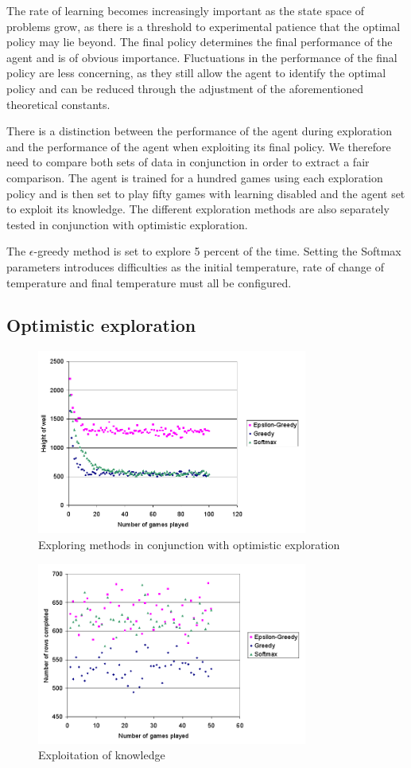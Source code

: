 \documentclass{rucsthesis}
\begin{document}
The rate of learning becomes increasingly important as the state space of problems grow, as there is a threshold to experimental patience that the optimal policy may lie beyond. The final policy determines the final performance of the agent and is of obvious importance. Fluctuations in the performance of the final policy are less concerning, as they still allow the agent to identify the optimal policy and can be reduced through the adjustment of the aforementioned theoretical constants.

There is a distinction between the performance of the agent during exploration and the performance of the agent when exploiting its final policy. We therefore need to compare both sets of data in conjunction in order to extract a fair comparison. The agent is trained for a hundred games using each exploration policy and is then set to play fifty games with learning disabled and the agent set to exploit its knowledge. The different exploration methods are also separately tested in conjunction with optimistic exploration.

The $\epsilon$-greedy method is set to explore 5 percent of the time. Setting the Softmax parameters introduces difficulties as the initial temperature, rate of change of temperature and final temperature must all be configured.

\subsection{Optimistic exploration}

\begin{figure}[h]
\centering
\includegraphics[width=3.5in]{optomisticexp.png}
\caption{Exploring methods in conjunction with optimistic exploration}
\label{fig:compexpopt}
\end{figure}

\begin{figure}[h]
\centering
\includegraphics[width=3.5in]{optomisticexpexploit.png}
\caption{Exploitation of knowledge}
\label{fig:compexpexpopt}
\end{figure}
\end{document}
